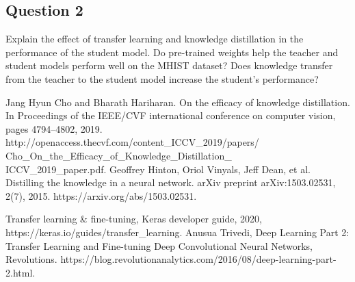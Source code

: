 \documentclass[conference]{IEEEtran}
\begin{document}
\subsection{Question 2} Explain the effect of transfer learning and knowledge distillation in the performance of the student model. Do pre-trained weights help the teacher and student models perform well on the MHIST dataset? Does knowledge transfer from the teacher to the student model increase the student’s performance?

\begin{thebibliography}{00}


 Jang Hyun Cho and Bharath Hariharan. On the efficacy of knowledge distillation. In Proceedings of the IEEE/CVF international conference on computer vision, pages 4794–4802, 2019. http://openaccess.thecvf.com/content\_ICCV\_2019/papers/\\Cho\_On\_the\_Efficacy\_of\_Knowledge\_Distillation\_\\ICCV\_2019\_paper.pdf.
 Geoffrey Hinton, Oriol Vinyals, Jeff Dean, et al. Distilling the knowledge in a neural network. arXiv preprint arXiv:1503.02531, 2(7), 2015. https://arxiv.org/abs/1503.02531.


 Transfer learning \& fine-tuning, Keras developer guide, 2020, https://keras.io/guides/transfer\_learning.
 Anusua Trivedi, Deep Learning Part 2: Transfer Learning and Fine-tuning Deep Convolutional Neural Networks, Revolutions. https://blog.revolutionanalytics.com/2016/08/deep-learning-part-2.html.
\end{thebibliography}
\end{document}
